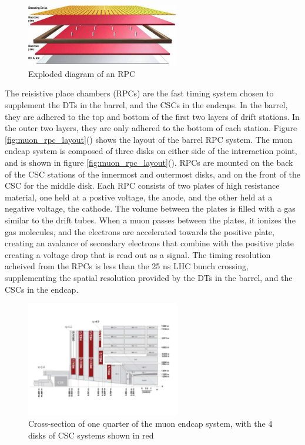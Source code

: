 \begin{figure}[h]
   \centering
  \includegraphics[width=0.6\textwidth]{Figures/CMS_Diagrams/Muon__RPC_schematic.jpg}
  \caption{Exploded diagram of an RPC} \label{fig:muon_rpc}
\end{figure}

\par The reisistive place chambers (RPCs) are the fast timing system
chosen to supplement the DTs in the barrel, and the CSCs in the
endcaps.  In the barrel, they are adhered to the top and bottom of the
first two layers of drift stations.  In the outer two layers, they are
only adhered to the bottom of each station.  Figure
\ref{fig:muon_rpc_layout}() shows the
layout of the barrel RPC system.  The muon endcap system is composed
of three disks on either side of the intreraction point, and is shown
in figure
\ref{fig:muon_rpc_layout}().  RPCs
are mounted on the back of the CSC stations of the innermost and
outermost disks, and on the front of the CSC for the middle disk. Each
RPC consists of two plates of high resistance material, one held at a
postive voltage, the anode, and the other held at a negative voltage, 
the cathode.  The volume between the plates is filled with a gas
similar to the drift tubes.  When a muon passes between the plates, it
ionizes the gas molecules, and the electrons are accelerated towards
the positive plate, creating an avalance of secondary electrons that
combine with the positive plate creating a voltage drop that is read
out as a signal.  The timing resolution acheived from the RPCs is less
than the 25 ns LHC bunch crossing, supplementing the spatial
resolution provided by the DTs in the barrel, and the CSCs in the
endcap.  

\begin{figure}[h]
   \centering
  \includegraphics[width=0.6\textwidth]{Figures/CMS_Diagrams/Muon__Endcap_CSC_layout.pdf}
  \caption{Cross-section of one quarter of the muon endcap system,
    with the 4 disks of CSC systems shown in red} \label{fig:muon_csc_layout}
\end{figure}

